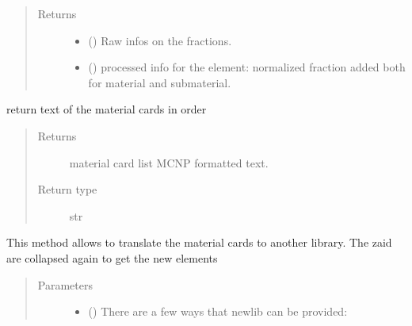 \documentclass[letterpaper,10pt,english]{sphinxmanual}
\begin{document}
\begin{fulllineitems}
\begin{fulllineitems}
\begin{quote}
\begin{description}
\begin{itemize}
\end{itemize}

\item[{Returns}] \leavevmode
\begin{itemize}
\item {} 
 () \textendash{} Raw infos on the fractions.

\item {} 
 () \textendash{} processed info for the element: normalized fraction added both for
material and submaterial.

\end{itemize}


\end{description}\end{quote}

\end{fulllineitems}


\begin{fulllineitems}
\label{\detokenize{api/inputgeneration:matreader.MatCardsList.to_text}}
return text of the material cards in order
\begin{quote}\begin{description}
\item[{Returns}] \leavevmode
material card list MCNP formatted text.

\item[{Return type}] \leavevmode
str

\end{description}\end{quote}

\end{fulllineitems}


\begin{fulllineitems}
\label{\detokenize{api/inputgeneration:matreader.MatCardsList.translate}}
This method allows to translate the material cards to another library.
The zaid are collapsed again to get the new elements
\begin{quote}\begin{description}
\item[{Parameters}] \leavevmode\begin{itemize}
\item {} 
 () \textendash{} 
There are a few ways that newlib can be provided:


\end{itemize}
\end{description}
\end{quote}
\end{fulllineitems}
\end{fulllineitems}
\end{document}
